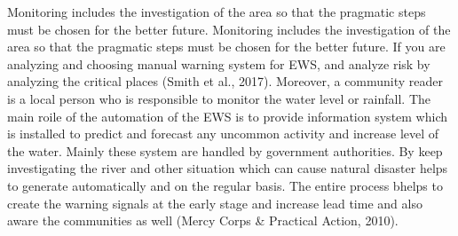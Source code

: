  Monitoring includes the investigation of the area so that the pragmatic steps must be chosen for the better future. Monitoring includes the investigation of the area so that the pragmatic steps must be chosen for the better future. If you are analyzing and choosing manual warning system for EWS, and analyze risk by analyzing the critical places (Smith et al., 2017). Moreover, a community reader is a local person who is responsible to monitor the water level or rainfall. The main roile of the automation of the EWS is to provide information system which is installed to predict and forecast any uncommon  activity and increase level of the water. Mainly these system are handled by government authorities.  By keep investigating the river and other situation which can  cause natural disaster helps to  generate automatically and on the regular basis. The entire process bhelps to create the warning signals at the early stage and increase lead time and also aware the communities as well (Mercy Corps & Practical Action, 2010).
